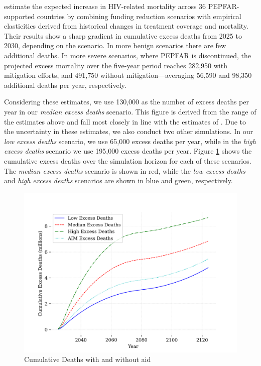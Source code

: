 \documentclass[letterpaper,12pt]{article}
\theoremstyle{definition}
\begin{document}
\begin{spacing}{1.5}
 estimate the expected increase in HIV-related mortality across 36 PEPFAR-supported countries by combining funding reduction scenarios with empirical elasticities derived from historical changes in treatment coverage and mortality. Their results show a sharp gradient in cumulative excess deaths from 2025 to 2030, depending on the scenario. In more benign scenarios there are few additional deaths. In more severe scenarios, where PEPFAR is discontinued, the projected excess mortality over the five-year period reaches 282,950 with mitigation efforts, and 491,750 without mitigation—averaging 56,590 and 98,350 additional deaths per year, respectively.

Considering these estimates, we use 130,000 as the number of excess deaths per year in our \textit{median excess deaths} scenario. This figure is derived from the range of the estimates above and fall most closely in line with the estimates of \citet{Gandhi2025}. Due to the uncertainty in these estimates, we also conduct two other simulations. In our \textit{low excess deaths} scenario, we use 65,000 excess deaths per year, while in the \textit{high excess deaths} scenario we use 195,000 excess deaths per year.  Figure \ref{fig:cumDeaths} shows the cumulative excess deaths over the simulation horizon for each of these scenarios. The \textit{median excess deaths} scenario is shown in red, while the \textit{low excess deaths} and \textit{high excess deaths} scenarios are shown in blue and green, respectively.

\begin{figure}[H]
    \caption{Cumulative Deaths with and without aid}
    \label{fig:cumDeaths}
    \centering
    \includegraphics[scale=0.75]{./tables_figures/cumulative_excess_deaths.png}
\end{figure}


\end{spacing}
\end{document}
